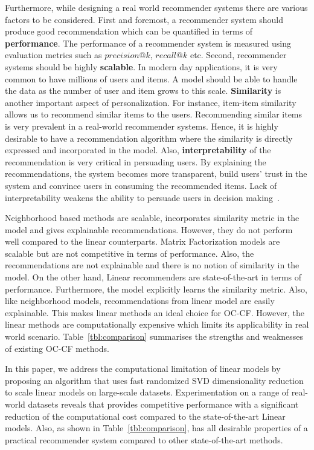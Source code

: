Furthermore, while designing a real world recommender systems there are various factors to be 
considered. First and foremost, a recommender system should  produce good recommendation which can be quantified in terms of \textbf{performance}. The performance of a recommender system is measured using evaluation metrics such as $precision@k$, $recall@k$ etc. Second, recommender systems should be highly \textbf{scalable}. In modern day applications, it is very common to have millions of users and items. A model should be able to handle the data as the number of user and item grows to this scale. \textbf{Similarity} is another important aspect of personalization. For instance, item-item similarity allows us to recommend similar items to the users. Recommending similar items is very prevalent in a real-world recommender systems. Hence, it is highly desirable to have a recommendation algorithm where the similarity is directly expressed and incorporated in the model. Also, \textbf{interpretability} of the recommendation is very critical in persuading users. By explaining the recommendations, the system becomes more transparent, build users' trust in the system and convince users in consuming the recommended items. Lack of interpretability weakens the ability to persuade users in decision making~\citep{explainabiltyVIG2009}.

Neighborhood based methods are scalable, incorporates similarity metric in the model and gives explainable recommendations. However, they do not perform well compared to the linear counterparts. Matrix Factorization models are scalable but are not competitive in terms of performance. Also, the recommendations are not explainable and there is no notion of similarity in the model. On the other hand, Linear recommenders are state-of-the-art in terms of performance. Furthermore, the model explicitly learns the similarity metric. Also, like neighborhood models, recommendations from linear model are easily explainable. This makes linear methods an ideal choice for OC-CF. However, the linear methods are computationally expensive which limits its applicability in real world scenario. Table~\ref{tbl:comparison} summarises the strengths and weaknesses of existing OC-CF methods.

In this paper, we address the computational limitation of linear models by proposing an algorithm that uses fast randomized SVD dimensionality reduction to scale linear models on large-scale datasets. 
Experimentation on a range of real-world datasets reveals that \LinearLow provides competitive performance with a significant reduction of the computational cost compared to the state-of-the-art Linear models. Also, as shown in Table~\ref{tbl:comparison}, \LinearLow has all desirable properties of a practical recommender system compared to other state-of-the-art methods.


